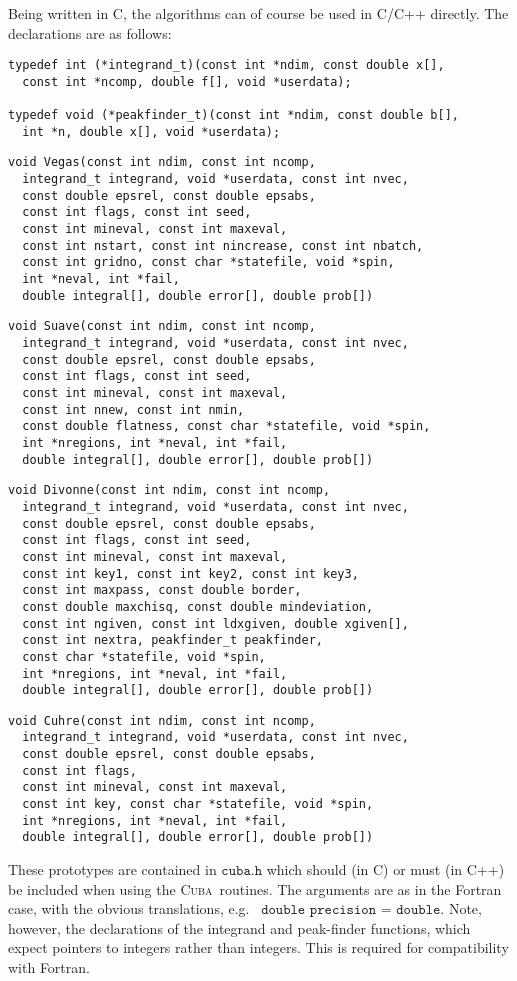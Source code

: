 \documentclass[12pt]{article}
\newcommand\cuba{\textsc{Cuba}}
\newcommand\eg{e.g.\ }
\newcommand\Code[1]{\ensuremath{\texttt{#1}}}
\begin{document}
Being written in C, the algorithms can of course be used in C/C++ 
directly.  The declarations are as follows:
\begin{verbatim}
typedef int (*integrand_t)(const int *ndim, const double x[],
  const int *ncomp, double f[], void *userdata);

typedef void (*peakfinder_t)(const int *ndim, const double b[],
  int *n, double x[], void *userdata);
\end{verbatim}
\begin{verbatim}
void Vegas(const int ndim, const int ncomp,
  integrand_t integrand, void *userdata, const int nvec,
  const double epsrel, const double epsabs,
  const int flags, const int seed,
  const int mineval, const int maxeval,
  const int nstart, const int nincrease, const int nbatch,
  const int gridno, const char *statefile, void *spin,
  int *neval, int *fail,
  double integral[], double error[], double prob[])
\end{verbatim}
\begin{verbatim}
void Suave(const int ndim, const int ncomp,
  integrand_t integrand, void *userdata, const int nvec,
  const double epsrel, const double epsabs,
  const int flags, const int seed,
  const int mineval, const int maxeval,
  const int nnew, const int nmin,
  const double flatness, const char *statefile, void *spin,
  int *nregions, int *neval, int *fail,
  double integral[], double error[], double prob[])
\end{verbatim}
\begin{verbatim}
void Divonne(const int ndim, const int ncomp,
  integrand_t integrand, void *userdata, const int nvec,
  const double epsrel, const double epsabs,
  const int flags, const int seed,
  const int mineval, const int maxeval,
  const int key1, const int key2, const int key3,
  const int maxpass, const double border,
  const double maxchisq, const double mindeviation,
  const int ngiven, const int ldxgiven, double xgiven[],
  const int nextra, peakfinder_t peakfinder,
  const char *statefile, void *spin,
  int *nregions, int *neval, int *fail,
  double integral[], double error[], double prob[])
\end{verbatim}
\begin{verbatim}
void Cuhre(const int ndim, const int ncomp,
  integrand_t integrand, void *userdata, const int nvec,
  const double epsrel, const double epsabs,
  const int flags,
  const int mineval, const int maxeval,
  const int key, const char *statefile, void *spin,
  int *nregions, int *neval, int *fail,
  double integral[], double error[], double prob[])
\end{verbatim}
These prototypes are contained in \Code{cuba.h} which should (in C) or
must (in C++) be included when using the \cuba\ routines.  The arguments
are as in the Fortran case, with the obvious translations, \eg
\Code{double precision} = \Code{double}.  Note, however, the
declarations of the integrand and peak-finder functions, which expect
pointers to integers rather than integers.  This is required for
compatibility with Fortran.
\end{document}
